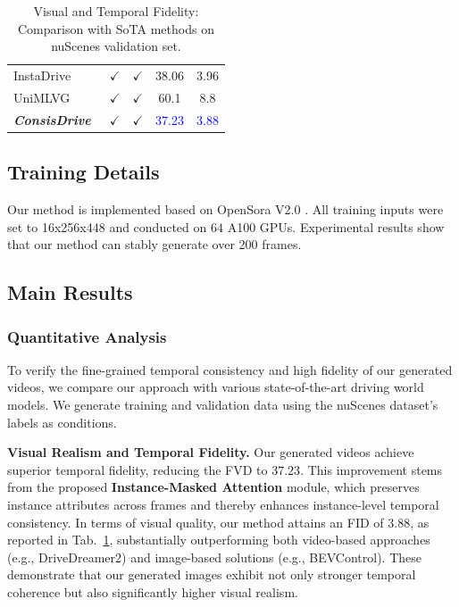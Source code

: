 \documentclass{article} %
\def\titleDef{\textbf{\textit{ConsisDrive}}}
\begin{document}
\begin{table}[h]
{\begin{tabular}{lcccc}
            InstaDrive \cite{yang25instadrive} &$\checkmark$ &$\checkmark$  & 38.06 & 3.96 \\
            UniMLVG \cite{chen2025unimlvgunifiedframeworkmultiview} &$\checkmark$ &$\checkmark$  & 60.1 & 8.8\\
            \hline
            \rowcolor[gray]{.9} 
            \titleDef~   &$\checkmark$  &$\checkmark$  & \textcolor{blue}{37.23}  & \textcolor{blue}{3.88}  \\
            \bottomrule
        \end{tabular}
        }
        \caption{Visual and Temporal Fidelity: Comparison with SoTA methods on nuScenes validation set. 
        }
        \label{tab:fvd}
\end{table}


\subsection{Training Details}
Our method is implemented based on OpenSora V2.0 \cite{peng2025opensora20trainingcommerciallevel}. 
All training inputs were set to 16x256x448 and conducted on $64$ A100 GPUs.
Experimental results show that our method can stably generate over 200 frames. %




\subsection{Main Results}

\subsubsection{Quantitative Analysis}
To verify the fine-grained temporal consistency and high fidelity of our generated videos, we compare our approach with various state-of-the-art driving world models. 
We generate training and validation data using the nuScenes dataset’s labels as conditions. 


\noindent\textbf{Visual Realism and Temporal Fidelity.} 
Our generated videos achieve superior temporal fidelity, reducing the FVD to $37.23$. This improvement stems from the proposed \textbf{Instance-Masked Attention} module, which preserves instance attributes across frames and thereby enhances instance-level temporal consistency.  
In terms of visual quality, our method attains an FID of $3.88$, as reported in Tab.~\ref{tab:fvd}, substantially outperforming both video-based approaches (e.g., DriveDreamer2) and image-based solutions (e.g., BEVControl). These demonstrate that our generated images exhibit not only stronger temporal coherence but also significantly higher visual realism.
\end{document}
